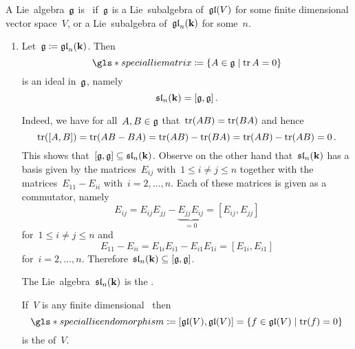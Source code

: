 \begin{definition}
  A Lie~algebra~$\mathfrak{g}$ is~ if~$\mathfrak{g}$ is a Lie~subalgebra of~$\mathfrak{gl}(V)$ for some finite dimensional vector space~$V$, or a Lie~subalgebra of~$\mathfrak{gl}_n(\mathbf{k})$ for some~$n$.
\end{definition}


\begin{examples}
  \leavevmode
  \begin{enumerate}
  \item
    Let~$\mathfrak{g} \coloneqq \mathfrak{gl}_n(\mathbf{k})$.
    Then
    \[
      \gls*{special lie matrix}
      \defined
      \{
        A \in \glie
      \suchthat
        \tr A = 0
      \}
    \]
    is an ideal in~$\mathfrak{g}$, namely
    \[
      \mathfrak{sl}_n(\mathbf{k})
      =
      [\mathfrak{g},\mathfrak{g}]  \,.
    \]
      
    Indeed, we have for all~$A, B \in \mathfrak{g}$ that~$\operatorname{tr}(AB) = \operatorname{tr}(BA)$ and hence
    \[
        \operatorname{tr}( [A,B] )
      = \operatorname{tr}(AB-BA)
      = \operatorname{tr}(AB) - \operatorname{tr}(BA)
      = \operatorname{tr}(AB) - \operatorname{tr}(AB)
      = 0  \,.
    \]
    This shows that~$[\mathfrak{g}, \mathfrak{g}] \subseteq \mathfrak{sl}_n(\mathbf{k})$.
    Observe on the other hand that~$\mathfrak{sl}_n(\mathbf{k})$ has a basis given by the matrices~$E_{ij}$ with~$1 \leq i \neq j \leq n$ together with the matrices~$E_{11} - E_{ii}$ with~$i = 2, \dotsc, n$.
    Each of these matrices is given as a commutator, namely
    \[
        E_{ij}
        =
        E_{ij} E_{jj} - \underbrace{ E_{jj} E_{ij} }_{=0}
        =
        [E_{ij}, E_{jj}]
    \]
    for~$1 \leq i \neq j \leq n$ and
    \[
      E_{11} - E_{ii}
      =
      E_{1i} E_{i1} - E_{i1} E_{1i}
      =
      [E_{1i}, E_{i1}]
    \]
    for~$i = 2, \dotsc, n$.
    Therefore~$\mathfrak{sl}_n(\mathbf{k}) \subseteq [\mathfrak{g}, \mathfrak{g}]$.
    
    The Lie~algebra~$\mathfrak{sl}_n(\mathbf{k})$ is the .
    
    If~$V$ is any finite dimensional~{\vectorspace{$\kf$}} then
    \[
      \gls*{special lie endomorphism}
      \defined
      [\gllie(V), \gllie(V)]
      =
      \{
        f \in \gllie(V)
      \suchthat
        \tr(f) = 0
      \}
    \]
    is the  of~$V$.
   

\end{enumerate}
\end{examples}
